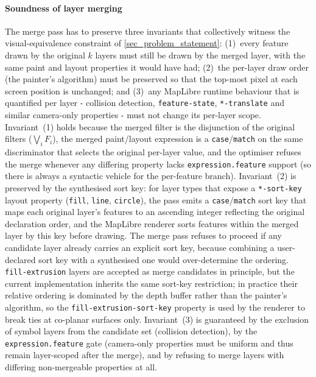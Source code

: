 \paragraph{Soundness of layer merging}
The merge pass has to preserve three invariants that collectively witness the visual-equivalence constraint of \cref{sec_problem_statement}:
(1)~every feature drawn by the original $k$ layers must still be drawn by the merged layer, with the same paint and layout properties it would have had;
(2)~the per-layer draw order (the painter's algorithm) must be preserved so that the top-most pixel at each screen position is unchanged; and
(3)~any MapLibre runtime behaviour that is quantified per layer - collision detection, \texttt{feature-state}, \texttt{*-translate} and similar camera-only properties - must not change its per-layer scope.
Invariant~(1) holds because the merged filter is the disjunction of the original filters ($\bigvee_i F_i$), the merged paint/layout expression is a \texttt{case}/\texttt{match} on the same discriminator that selects the original per-layer value, and the optimiser refuses the merge whenever any differing property lacks \texttt{expression.feature} support (so there is always a syntactic vehicle for the per-feature branch).
Invariant~(2) is preserved by the synthesised sort key: for layer types that expose a \texttt{*-sort-key} layout property (\texttt{fill}, \texttt{line}, \texttt{circle}), the pass emits a \texttt{case}/\texttt{match} sort key that maps each original layer's features to an ascending integer reflecting the original declaration order, and the MapLibre renderer sorts features within the merged layer by this key before drawing.
The merge pass refuses to proceed if any candidate layer already carries an explicit sort key, because combining a user-declared sort key with a synthesised one would over-determine the ordering.
\texttt{fill-extrusion} layers are accepted as merge candidates in principle, but the current implementation inherits the same sort-key restriction; in practice their relative ordering is dominated by the depth buffer rather than the painter's algorithm, so the \texttt{fill-extrusion-sort-key} property is used by the renderer to break ties at co-planar surfaces only.
Invariant~(3) is guaranteed by the exclusion of symbol layers from the candidate set (collision detection), by the \texttt{expression.feature} gate (camera-only properties must be uniform and thus remain layer-scoped after the merge), and by refusing to merge layers with differing non-mergeable properties at all.

